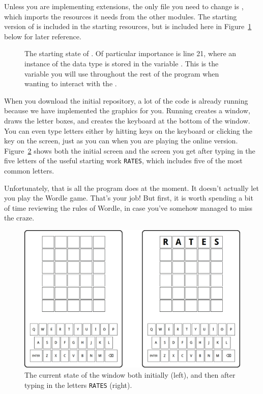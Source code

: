 \documentclass[letterpaper,12pt]{exam}
\begin{document}
Unless you are implementing extensions, the only file you need to change is , which imports the resources it needs from the other modules. The starting version of  is included in the starting resources, but is included here in Figure~\ref{fig:wordlestart} below for later reference.

\begin{figure}[!hb]
	\centering\scriptsize
	
	\caption{The starting state of . Of particular importance is line 21, where an instance of the  data type is stored in the variable . This is the variable you will use throughout the rest of the program when wanting to interact with the .}
	\label{fig:wordlestart}
\end{figure}

When you download the initial repository, a lot of the code is already running because we have implemented the graphics for you. Running  creates a window, draws the letter boxes, and creates the keyboard at the bottom of the window. You can even type letters either by hitting keys on the keyboard or clicking the key on the screen, just as you can when you are playing the online version. Figure~\ref{fig:wordle_starts} shows both the initial screen and the screen you get after typing in the five letters of the useful starting work \texttt{RATES}, which includes five of the most common letters.

Unfortunately, that is all the program does at the moment. It doesn't actually let you play the Wordle game. That's your job! But first, it is worth spending a bit of time reviewing the rules of Wordle, in case you've somehow managed to miss the craze.

\begin{figure}[!ht]
	\centering
	\includegraphics[width=0.7\linewidth]{./initial.png}
	\caption{The current state of the window both initially (left), and then after typing in the letters \texttt{RATES} (right).}
	\label{fig:wordle_starts}
\end{figure}
\end{document}
